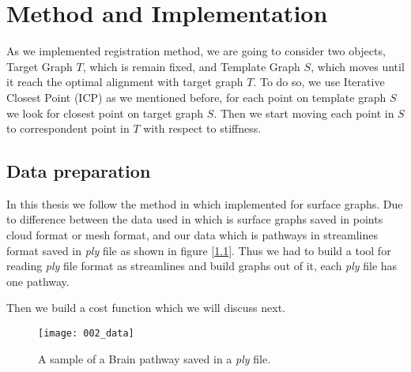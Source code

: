 \documentclass[../structure.tex]{subfiles}
\begin{document}
\chapter{Method and Implementation}
As we implemented registration method, we are going to consider two objects, Target Graph $T$, which is remain fixed, and Template Graph $S$, which moves until it reach the optimal alignment with target graph $T$. To do so, we use Iterative Closest Point (ICP) as we mentioned before, for each point on template graph $S$ we look for closest point on target graph $S$. Then we start moving each point in $S$ to correspondent point in $T$ with respect to stiffness.

\section{Data preparation}
In this thesis we follow the method in \cite{Amberg2007} which implemented for surface graphs. Due to difference between the data used in \cite{Amberg2007} which is surface graphs saved in points cloud format or mesh format, and our data which is pathways in streamlines format saved in \textit{ply} file as shown in figure [\ref{fig:data}]. Thus we had to build a tool for reading \textit{ply} file format as streamlines and build graphs out of it, each \textit{ply} file has one pathway.

Then we build a cost function which we will discuss next. 

\begin{figure}[h!]
\centering
\texttt{[image: 002\_data]}
\captionsetup{justification=centering}
\caption{A sample of a Brain pathway saved in a \textit{ply} file.}
\label{fig:data}
\end{figure}
\end{document}
